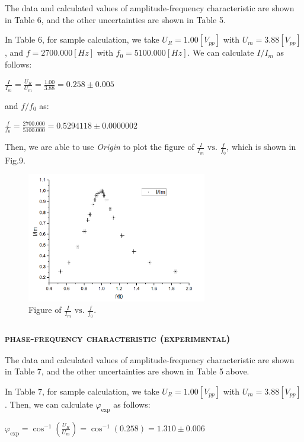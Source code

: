 \documentclass[a4paper,12pt]{article}
\begin{document}
The data and calculated values of amplitude-frequency characteristic are shown in Table 6, and the other uncertainties are shown in Table 5.

In Table 6, for sample calculation, we take $U_R = 1.00 [V_{pp}]$ with $U_m = 3.88 [V_{pp}]$, and $f = 2700.000 [Hz]$ with $f_0 = 5100.000 [Hz]$. We can calculate $I/I_m$ as follows:
\begin{center}
$\displaystyle \frac{I}{I_{m}}=\frac{U_{R}}{U_{m}}=\frac{1.00}{3.88}=0.258 \pm 0.005 $ 
\end{center}
and $f/f_0$ as:
\begin{center}
$\displaystyle \frac{f}{f_0}=\frac{2700.000}{5100.000}=0.5294118 \pm 0.0000002 $ 
\end{center}

Then, we are able to use \textit{Origin} to plot the figure of $\displaystyle \frac{I}{I_{m}} \text { vs. } \frac{f}{f_{0}}$, which is shown in Fig.9.

\newpage
\begin{figure}[htb] 
    \centering
    \includegraphics[width=0.7\textwidth]{o1} 
    \caption{Figure of $\frac{I}{I_{m}} \text { vs. } \frac{f}{f_{0}}$.} 
\end{figure}

\subsubsection{\textsc{phase-frequency characteristic (experimental)}}
The data and calculated values of amplitude-frequency characteristic are shown in Table 7, and the other uncertainties are shown in Table 5 above.

In Table 7, for sample calculation, we take $U_R = 1.00 [V_{pp}]$ with $U_m = 3.88 [V_{pp}]$. Then, we can calculate $\varphi_{\exp }$ as follows:

\begin{center}
$\varphi_{\exp }=\cos ^{-1}\left(\frac{U_{R}}{U_{m}}\right)=\cos ^{-1}(0.258)=1.310 \pm 0.006$
\end{center}
\end{document}

